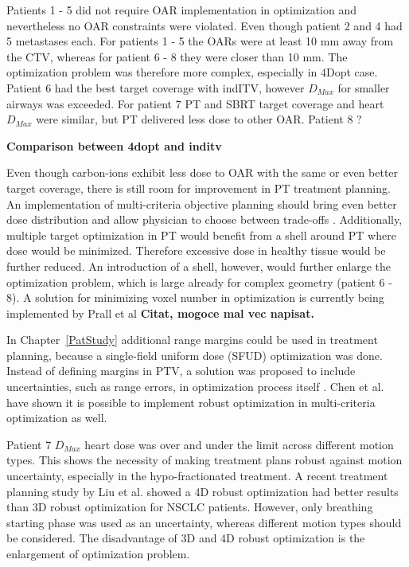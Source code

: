 \documentclass[type=dr, dr=rernat, accentcolor=tud7b,colorbacktitle, bigchapter, openright, twoside, 12pt ]{tudthesis}
\begin{document}
Patients 1 - 5 did not require OAR implementation in optimization and nevertheless no OAR constraints were violated. Even though patient 2 and 4 had 5 metastases each. For patients 1 - 5 the OARs were at least 10 mm away from the CTV, whereas for
patient 6 - 8 they were closer than 10 mm. The optimization problem was therefore more complex, especially in 4Dopt case. Patient 6 had the best target coverage with indITV, however $D_{Max}$ for smaller airways was exceeded. For patient 7 PT and SBRT target
coverage and heart $D_{Max}$ were similar, but PT delivered less dose to other OAR. Patient 8 ?


\textbf{Comparison between 4dopt and inditv}

Even though carbon-ions exhibit less dose to OAR with the same or even better target coverage, there is still room for improvement in PT treatment planning. An implementation of multi-criteria objective planning should bring
even better dose distribution and allow physician to choose between trade-offs  \cite{Breedveld2007, Chen2010}. Additionally, multiple target optimization in PT would benefit from a shell around PT where dose would be minimized. Therefore excessive dose
in healthy tissue would be further reduced. An introduction of a shell, however, would further enlarge the optimization problem, which is large already for complex geometry (patient 6 - 8). A solution for minimizing voxel number in optimization is
currently being implemented by Prall et al \textbf{Citat, mogoce mal vec napisat.} 

In Chapter~\ref{PatStudy} additional range margins could be used in treatment planning, because a single-field uniform dose (SFUD) optimization was done. Instead of defining margins in PTV, a solution was proposed to include uncertainties, such as range errors, 
in optimization process itself \cite{Pflugfelder2008, Unkelbach2009, Fredriksson2011, Chen2012}. Chen et al. have shown it is possible to implement robust optimization in multi-criteria optimization as well. 

Patient 7 $D_{Max}$ heart dose was over and under the limit across different motion types. This shows the necessity of making treatment plans robust against motion uncertainty, especially in the hypo-fractionated treatment. A recent treatment planning study by Liu et al. \cite{Liu2016}
showed a 4D robust optimization had better results than 3D robust optimization for NSCLC patients. However, only breathing starting phase was used as an uncertainty, whereas different motion types should be considered. The disadvantage of 3D and 4D robust optimization is the enlargement of 
optimization problem.
\end{document}
